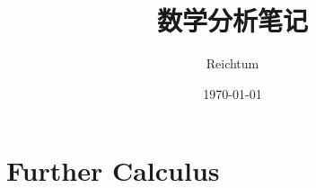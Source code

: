 \documentclass[cn,10pt,citestyle=gb7714-2015,bibstyle=gb7714-2015,bibtex]{elegantbook}
\title{数学分析笔记}
\author{Reichtum}
\institute{ZheJiang University}
\date{\today}
\begin{document}
\maketitle
\frontmatter
\tableofcontents
\newpage

\mainmatter
\newpage
\chapter{Further Calculus}

%


\end{document}

